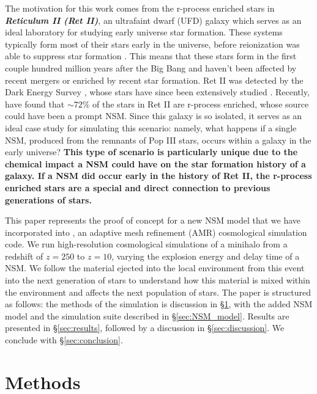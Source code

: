 \documentclass[fleqn,usenatbib]{mnras}
\begin{document}
The motivation for this work comes from the r-process enriched stars in \textbf{\textit{Reticulum II (Ret II)}}, an ultrafaint dwarf (UFD) galaxy which serves as an ideal laboratory for studying early universe star formation. These systems typically form most of their stars early in the universe, before reionization was able to suppress star formation \citep{Weisz14}. This means that these stars form in the first couple hundred million years after the Big Bang and haven't been affected by recent mergers or enriched by recent star formation. Ret II was detected by the Dark Energy Survey \citep{Bechtol15}, whose stars have since been extensively studied \citep{Simon15, Roederer16, Ji16, Ji22}. Recently, \citet{Ji22} have found that $\sim 72\%$ of the stars in Ret II are r-process enriched, whose source could have been a prompt NSM. Since this galaxy is so isolated, it serves as an ideal case study for simulating this scenario: namely, what happens if a single NSM, produced from the remnants of Pop III stars, occurs within a galaxy in the early universe? \textbf{This type of scenario is particularly unique due to the chemical impact a NSM could have on the star formation history of a galaxy. If a NSM did occur early in the history of Ret II, the r-process enriched stars are a special and direct connection to previous generations of stars.}

This paper represents the proof of concept for a new NSM model that we have incorporated into \enzo{}, an adaptive mesh refinement (AMR) cosmological simulation code. We run high-resolution cosmological simulations of a minihalo from a redshift of $z = 250$ to $z = 10$, varying the explosion energy and delay time of a NSM. We follow the material ejected into the local environment from this event into the next generation of stars to understand how this material is mixed within the environment and affects the next population of stars. The paper is structured as follows: the methods of the simulation is discussion in \S \ref{sec:methods}, with the added NSM model and the simulation suite described in \S \ref{sec:NSM_model}. Results are presented in \S \ref{sec:results}, followed by a discussion in \S \ref{sec:discussion}. We conclude with \S \ref{sec:conclusion}.

\section{Methods} \label{sec:methods}
\end{document}
